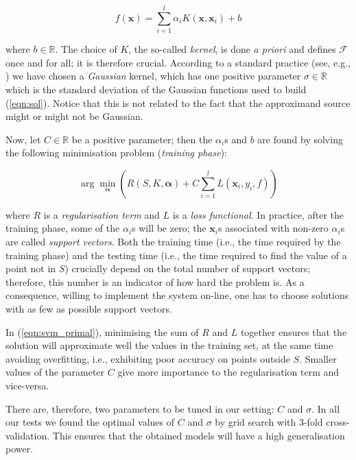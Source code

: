 \documentclass[a4paper,10pt,conference]{ieeeconf}
\def\RR{\mathbb{R}}
\def\xx{\mathbf{x}}
\def\aa{\boldsymbol{\alpha}}
\begin{document}
\begin{equation} \label{eqn:sol}
  f(\xx) = \sum_{i=1}^l \alpha_i K(\xx,\xx_i) + b
\end{equation}

\noindent where $b \in \RR$. The choice of $K$, the so-called
\emph{kernel}, is done \emph{a priori} and defines $\mathcal{F}$ once
and for all; it is therefore crucial. According to a standard practice
(see, e.g., \cite{Cristianini00}) we have chosen a \emph{Gaussian}
kernel, which has one positive parameter $\sigma \in \RR$ which is the
standard deviation of the Gaussian functions used to build
(\ref{eqn:sol}). Notice that this is not related to the fact that the
approximand source might or might not be Gaussian.

Now, let $C \in \RR$ be a positive parameter; then the $\alpha_i$s and
$b$ are found by solving the following minimisation problem
(\emph{training phase}):

\begin{equation} \label{eqn:svm_primal}
  \arg \min_{\aa} \left( R(S,K,\aa) + C \sum_{i=1}^l L(\xx_i,y_i,f) \right)
\end{equation}

\noindent where $R$ is a \emph{regularisation term} and $L$ is a
\emph{loss functional}. In practice, after the training phase, some of
the $\alpha_i$s will be zero; the $\xx_i$s associated with non-zero
$\alpha_i$s are called \emph{support vectors}. Both the training time
(i.e., the time required by the training phase) and the testing time
(i.e., the time required to find the value of a point not in $S$)
crucially depend on the total number of support vectors; therefore,
this number is an indicator of how hard the problem is. As a
consequence, willing to implement the system on-line, one has to
choose solutions with as few as possible support vectors.

In (\ref{eqn:svm_primal}), minimising the sum of $R$ and $L$ together
ensures that the solution will approximate well the values in the
training set, at the same time avoiding overfitting, i.e., exhibiting
poor accuracy on points outside $S$. Smaller values of the parameter
$C$ give more importance to the regularisation term and vice-versa.

There are, therefore, two parameters to be tuned in our setting: $C$
and $\sigma$. In all our tests we found the optimal values of $C$ and
$\sigma$ by grid search with $3$-fold cross-validation. This ensures
that the obtained models will have a high generalisation
power. \cite{...}
\end{document}
